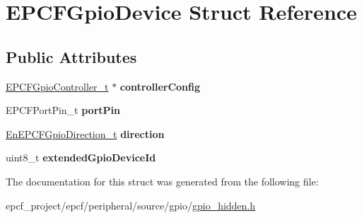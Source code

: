 \hypertarget{structEPCFGpioDevice}{}\section{E\+P\+C\+F\+Gpio\+Device Struct Reference}
\label{structEPCFGpioDevice}
\subsection*{Public Attributes}
\begin{DoxyCompactItemize}
\item 
\mbox{\label{structEPCFGpioDevice_ae74131c335a92f9170e160560f17a896}} 
\mbox{\hyperlink{structEPCFGpioController}{E\+P\+C\+F\+Gpio\+Controller\+\_\+t}} $\ast$ {\bfseries controller\+Config}
\item 
\mbox{\label{structEPCFGpioDevice_ab0bffae26dd0f3210e0d0c684727eb14}} 
E\+P\+C\+F\+Port\+Pin\+\_\+t {\bfseries port\+Pin}
\item 
\mbox{\label{structEPCFGpioDevice_aab8baefeb932dcd86ff755aafd9566c8}} 
\mbox{\hyperlink{gpio_8h_acfac25969bd9ca852e4a8293fccf01b1}{En\+E\+P\+C\+F\+Gpio\+Direction\+\_\+t}} {\bfseries direction}
\item 
\mbox{\label{structEPCFGpioDevice_ab91e3c93ec7866e07cc8a1209a8dc642}} 
uint8\+\_\+t {\bfseries extended\+Gpio\+Device\+Id}
\end{DoxyCompactItemize}


The documentation for this struct was generated from the following file\+:\begin{DoxyCompactItemize}
\item 
epcf\+\_\+project/epcf/peripheral/source/gpio/\mbox{\hyperlink{gpio__hidden_8h}{gpio\+\_\+hidden.\+h}}\end{DoxyCompactItemize}
